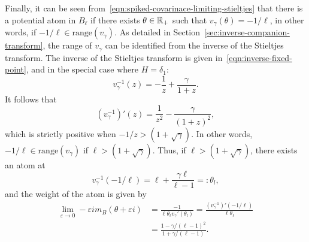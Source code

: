 \documentclass{article}
\newcommand{\range}{\mathrm{range}}
\begin{document}
Finally, it can be seen from~\eqref{eqn:spiked-covarinace-limiting-stieltjes} that there is a potential atom in $B_{\ell}$ if there exists $\theta \in \mathbb{R}_{+}$ such that $v_{\gamma}(\theta) = -1/\ell$, in other words, if $-1/\ell \in \range(v_{\gamma})$. As detailed in Section~\ref{sec:inverse-companion-transform}, the range of $v_{\gamma}$ can be identified from the inverse of the Stieltjes transform. The inverse of the Stieltjes transform is given in~\eqref{eqn:inverse-fixed-point}, and in the special case where $H = \delta_1$:
$$
v_{\gamma}^{-1}(z) = -\frac{1}{z} + \frac{\gamma}{1 + z}.
$$
It follows that
$$
(v_{\gamma}^{-1})'(z) = \frac{1}{z^2} - \frac{\gamma}{(1 + z)^2},
$$
which is strictly positive when $-1/z > (1 + \sqrt{\gamma})$. In other words, $-1/\ell \in \range(v_{\gamma})$ if $\ell > (1 + \sqrt{\gamma})$. Thus, if $\ell > (1 + \sqrt{\gamma})$, there exists an atom at 
$$
v_{\gamma}^{-1}(-1/\ell) = \ell + \frac{\gamma \ell}{\ell - 1} =: \theta_l,
$$
and the weight of the atom is given by
\begin{align*}
\lim_{\varepsilon \to 0} - \varepsilon i m_{B}(\theta + \varepsilon i) 
& = \frac{-1}{\ell \theta_\ell v_{\gamma}'(\theta_l)} = \frac{(v_{\gamma}^{-1})'(-1/\ell)}{\ell \theta_{\ell}} \\
& = \frac{1 - \gamma/(\ell - 1)^2}{1 + \gamma/(\ell - 1)}.
\end{align*}


	
	
\end{document}
